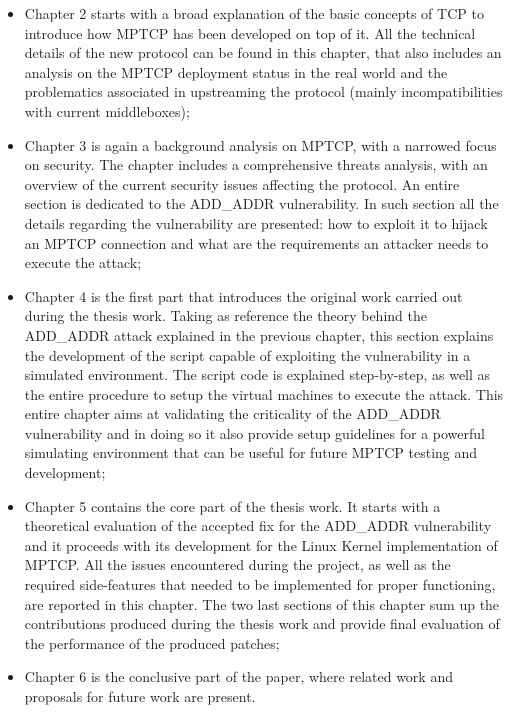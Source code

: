 \begin{itemize}
  \item Chapter 2 starts with a broad explanation of the basic concepts of TCP to introduce how MPTCP has been developed on top of it. All the technical details of the new protocol can be found in this chapter, that also includes an analysis on the MPTCP deployment status in the real world and the problematics associated in upstreaming the protocol (mainly incompatibilities with current middleboxes);
  \item Chapter 3 is again a background analysis on MPTCP, with a narrowed focus on security. The chapter includes a comprehensive threats analysis, with an overview of the current security issues affecting the protocol. An entire section is dedicated to the ADD\_ADDR vulnerability. In such section all the details regarding the vulnerability are presented: how to exploit it to hijack an MPTCP connection and what are the requirements  an attacker needs to execute the attack;
  \item Chapter 4 is the first part that introduces the original work carried out during the thesis work. Taking as reference the theory behind the ADD\_ADDR attack explained in the previous chapter, this section explains the development of the script capable of exploiting the vulnerability in a simulated environment. The script code is explained step-by-step, as well as the entire procedure to setup the virtual machines to execute the attack. This entire chapter aims at validating the criticality of the ADD\_ADDR vulnerability and in doing so it also provide setup guidelines for a powerful simulating environment that can be useful for future MPTCP testing and development;
  \item Chapter 5 contains the core part of the thesis work. It starts with a theoretical evaluation of the accepted fix for the ADD\_ADDR vulnerability and it proceeds with its development for the Linux Kernel implementation of MPTCP. All the issues encountered during the project, as well as the required side-features that needed to be implemented for proper functioning, are reported in this chapter. The two last sections of this chapter sum up the contributions produced during the thesis work and provide final evaluation of the performance of the produced patches;
  \item Chapter 6 is the conclusive part of the paper, where related work and proposals for future work are present.
\end{itemize}
